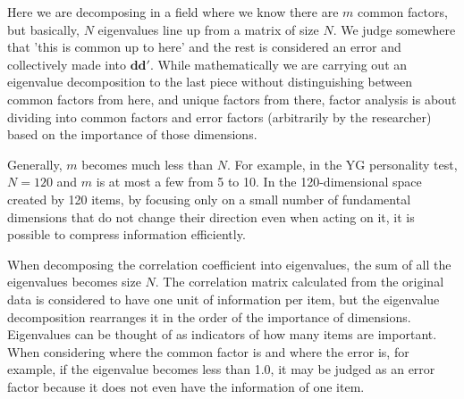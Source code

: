 \documentclass{ltjsbook}
\begin{document}
Here we are decomposing in a field where we know there are $m$ common factors, but basically, $N$ eigenvalues line up from a matrix of size $N$. We judge somewhere that 'this is common up to here' and the rest is considered an error and collectively made into $\bm{dd'}$. While mathematically we are carrying out an eigenvalue decomposition to the last piece without distinguishing between common factors from here, and unique factors from there, factor analysis is about dividing into common factors and error factors (arbitrarily by the researcher) based on the importance of those dimensions.

Generally, $m$ becomes much less than $N$. For example, in the YG personality test, $N=120$ and $m$ is at most a few from 5 to 10. In the 120-dimensional space created by 120 items, by focusing only on a small number of fundamental dimensions that do not change their direction even when acting on it, it is possible to compress information efficiently.

When decomposing the correlation coefficient into eigenvalues, the sum of all the eigenvalues becomes size $N$. The correlation matrix calculated from the original data is considered to have one unit of information per item, but the eigenvalue decomposition rearranges it in the order of the importance of dimensions. Eigenvalues can be thought of as indicators of how many items are important. When considering where the common factor is and where the error is, for example, if the eigenvalue becomes less than 1.0, it may be judged as an error factor because it does not even have the information of one item.
\end{document}
